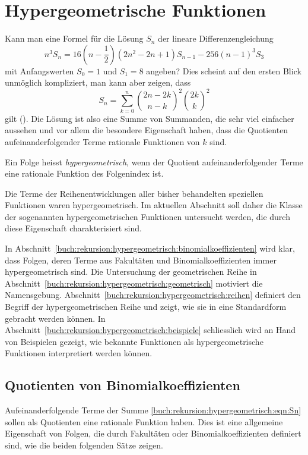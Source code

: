 %
%
%
\section{Hypergeometrische Funktionen
\label{buch:rekursion:section:hypergeometrische-funktion}}
Kann man eine Formel für die Lösung $S_n$ der lineare Differenzengleichung
\[
n^3S_{n}
=
16(n-{\textstyle\frac12})(2n^2-2n+1)S_{n-1}
-256(n-1)^3S_3
\]
mit Anfangswerten $S_0=1$ und $S_1=8$ angeben?
Dies scheint auf den ersten Blick unmöglich kompliziert, man kann aber
zeigen, dass
\begin{equation}
S_n
=
\sum_{k=0}^n 
\binom{2n-2k}{n-k}^2 \binom{2k}{k}^2
\label{buch:rekursion:hypergeometrisch:eqn:Sn}
\end{equation}
gilt (\cite[p.~xi]{buch:ab}).
Die Lösung ist also eine Summe von Summanden, die sehr viel einfacher
aussehen und vor allem die besondere Eigenschaft haben, dass die
Quotienten aufeinanderfolgender Terme rationale Funktionen von $k$
sind.

\begin{definition}
Ein Folge heisst {\em hypergeometrisch}, wenn der Quotient aufeinanderfolgender
%
%
Terme eine rationale Funktion des Folgenindex ist.
\end{definition}

Die Terme der Reihenentwicklungen aller bisher behandelten speziellen
Funktionen waren hypergeometrisch.
Im aktuellen Abschnitt soll daher die Klasse der sogenannten
hypergeometrischen Funktionen untersucht werden, die durch diese
Eigenschaft charakterisiert sind.

In Abschnitt~\ref{buch:rekursion:hypergeometrisch:binomialkoeffizienten}
wird klar, dass Folgen, deren Terme aus Fakultäten und Binomialkoeffizienten
immer hypergeometrisch sind.
Die Untersuchung der geometrischen Reihe in
Abschnitt~\ref{buch:rekursion:hypergeometrisch:geometrisch}
motiviert die Namensgebung.
Abschnitt~\ref{buch:rekursion:hypergeometrisch:reihen}
definiert den Begriff der hypergeometrischen Reihe und zeigt, 
wie sie in eine Standardform gebracht werden können.
In Abschnitt~\ref{buch:rekursion:hypergeometrisch:beispiele}
schliesslich wird an Hand von Beispielen gezeigt, wie bekannte
Funktionen als hypergeometrische Funktionen interpretiert werden können.

%
%
\subsection{Quotienten von Binomialkoeffizienten
\label{buch:rekursion:hypergeometrisch:binomialkoeffizienten}}
Aufeinanderfolgende Terme der Summe
\eqref{buch:rekursion:hypergeometrisch:eqn:Sn}
sollen als Quotienten eine rationale Funktion haben.
Dies ist eine allgemeine Eigenschaft von Folgen, die durch Fakultäten
oder Binomialkoeffizienten definiert sind, wie die beiden folgenden
Sätze zeigen.

